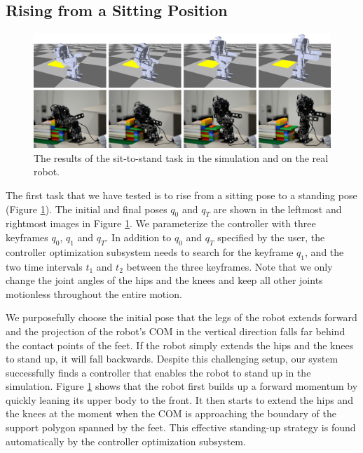\subsection{Rising from a Sitting Position}

\begin{figure}[!t]
  \centering
  \includegraphics[width=\textwidth]{figures/sit2Stand}
  \caption{The results of the sit-to-stand task in the simulation and on the real robot.}
  \label{fig:sit2Stand}
\end{figure}

The first task that we have tested is to rise from a sitting pose to a standing pose (Figure \ref{fig:sit2Stand}). The initial and final poses $q_0$ and $q_T$ are shown in the leftmost and rightmost images in Figure \ref{fig:sit2Stand}. We parameterize the controller with three keyframes $q_0$, $q_1$ and $q_T$. In addition to $q_0$ and $q_T$ specified by the user, the controller optimization subsystem needs to search for the keyframe $q_1$, and the two time intervals $t_1$ and $t_2$ between the three keyframes. Note that we only change the joint angles of the hips and the knees and keep all other joints motionless throughout the entire motion.

We purposefully choose the initial pose that the legs of the robot extends forward and the projection of the robot's COM in the vertical direction falls far behind the contact points of the feet. If the robot simply extends the hips and the knees to stand up, it will fall backwards. Despite this challenging setup, our system successfully finds a controller that enables the robot to stand up in the simulation. Figure \ref{fig:sit2Stand} shows that the robot first builds up a forward momentum by quickly leaning its upper body to the front. It then starts to extend the hips and the knees at the moment when the COM is approaching the boundary of the support polygon spanned by the feet. This effective standing-up strategy is found automatically by the controller optimization subsystem.

